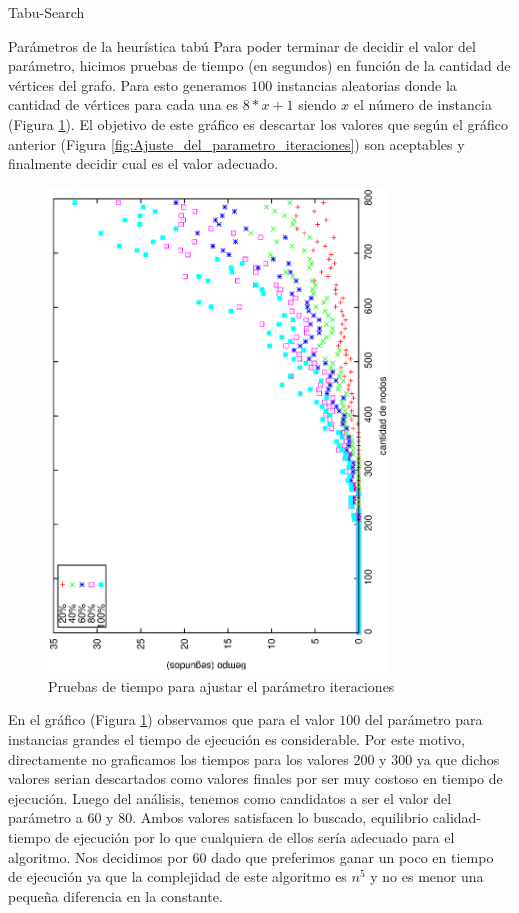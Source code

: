 \begin{section}{Tabu-Search}
\begin{subsection}{Parámetros de la heurística tabú}
	Para poder terminar de decidir el valor del parámetro, hicimos pruebas de tiempo (en segundos) en función de la cantidad de vértices del grafo. Para esto generamos $100$ instancias aleatorias donde la cantidad de vértices para cada una es $8*x+1$ siendo $x$ el número de instancia (Figura \ref{fig:Ajuste_del_parametro_iteraciones2}). El objetivo de este gráfico es descartar los valores que según el gráfico anterior (Figura \ref{fig:Ajuste_del_parametro_iteraciones}) son aceptables y finalmente decidir cual es el valor adecuado.

	\begin{figure}[H]
		\centering
		    	\includegraphics[width=9cm,angle=-90]{tabu_search/time.eps}
		\caption{Pruebas de tiempo para ajustar el parámetro iteraciones}
		\label{fig:Ajuste_del_parametro_iteraciones2}
	\end{figure}
	
	En el gráfico (Figura \ref{fig:Ajuste_del_parametro_iteraciones2}) observamos que para el valor $100$ del parámetro para instancias grandes el tiempo de ejecución es considerable. Por este motivo, directamente no graficamos los tiempos para los valores $200$ y $300$ ya que dichos valores serian descartados como valores finales por ser muy costoso en tiempo de ejecución.
	Luego del análisis, tenemos como candidatos a ser el valor del parámetro a $60$ y $80$. Ambos valores satisfacen lo buscado, equilibrio calidad-tiempo de ejecución por lo que cualquiera de ellos sería adecuado para el algoritmo. Nos decidimos por $60$ dado que preferimos ganar un poco en tiempo de ejecución ya que la complejidad de este algoritmo es $n^5$ y no es menor una pequeña diferencia en la constante.
	\end{subsection}
\end{section}
